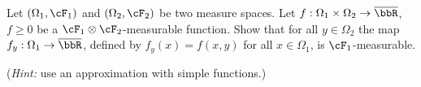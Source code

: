 \begin{problem}
    
\end{problem}

\begin{problem}
    
\end{problem}

\begin{problem}
    Let $(\Omega_1,\cF_1)$ and $(\Omega_2,\cF_2)$ be two measure spaces. Let $f:\Omega_1\times\Omega_2\to \overline{\bbR}$, $f\geq 0$ be a $\cF_1\otimes \cF_2$-measurable function. Show that for all $y\in \Omega_2$ the map $f_y : \Omega_1\to \overline{\bbR}$, defined by $f_y(x) = f(x,y)$ for all $x\in \Omega_1$, is $\cF_1$-measurable.

    (\emph{Hint:} use an approximation with simple functions.)
\end{problem}